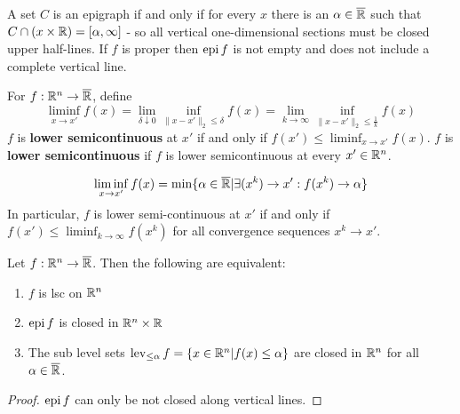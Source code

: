 \begin{thm}
  \label{sec:existence-4}
  A set $C$ is an epigraph if and only if for every $x$ there is an
  $\alpha \in \overline {\mathbb{R}}$ such that $C \cap (x \times \mathbb{R}) = [\alpha,
  \infty]$ - so all vertical one-dimensional sections must be closed
  upper half-lines. If $f$ is proper then $\operatorname*{epi} f $ is not empty and
  does not include a complete vertical line.
\end{thm}

\begin{defn}
  \label{sec:existence-5}
  For $f: \mathbb{R}^{n} \rightarrow \overline {\mathbb{R}}$, define
  \begin{equation}
    \label{eq:3}
    \liminf_{x \rightarrow x'} f(x) = \lim_{\delta \downarrow 0}
    \inf_{\| x - x'\|_{2} \leq \delta} f(x) = \lim_{k \rightarrow
      \infty} \inf_{\| x - x'\|_{2} \leq \frac{1}{k}} f(x)
  \end{equation}
  $f$ is \textbf{lower semicontinuous} at $x'$ if and only if $f(x')
  \leq \liminf_{x \rightarrow x'} f(x)$.
  $f$ is \textbf{lower semicontinuous} if $f$ is lower semicontinuous at
  every $x' \in \mathbb{R}^{n}$.
\end{defn}

\begin{thm}
  \label{sec:existence-7}
  \begin{equation}
    \label{eq:4}
    \liminf_{x \rightarrow x'} f(x) = \min \{ \alpha \in \overline {\mathbb{R}}
    | \exists (x^{k}) \rightarrow x' : f(x^{k}) \rightarrow \alpha \}
  \end{equation}
  In particular, $f$ is lower semi-continuous at $x'$ if and only if
  $f(x') \leq \liminf_{k \rightarrow \infty} f(x^{k})$ for all
  convergence sequences $x^{k} \rightarrow x'$.
\end{thm}

\begin{thm}
  \label{sec:existence-8}
  Let $f: \mathbb{R}^{n} \rightarrow \overline {\mathbb{R}}$.  Then the following are
  equivalent:
  \begin{enumerate}
  \item $f$ is lsc on $\mathbb{R}^{n}$
  \item $\operatorname*{epi} f$ is closed in $\mathbb{R}^{n} \times \mathbb{R}$
  \item The sub level sets $\operatorname*{lev}_{\leq \alpha} f = \{ x \in \mathbb{R}^{n} |
    f(x) \leq \alpha \} $ are closed in $\mathbb{R}^{n}$ for all $\alpha \in
    \overline {\mathbb{R}}$.
  \end{enumerate}
\end{thm}

\begin{proof}
  $\operatorname*{epi} f$ can only be not closed along vertical lines.
\end{proof}

